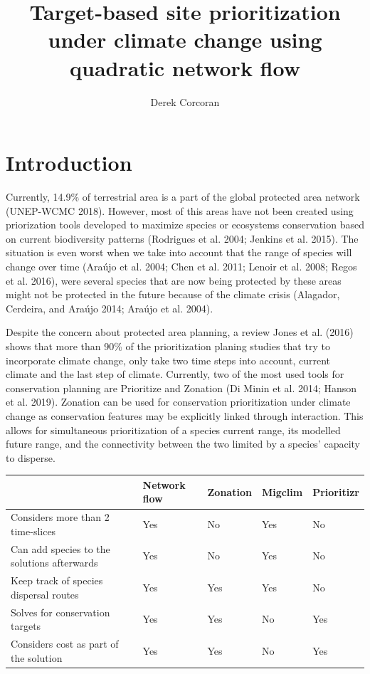 \documentclass[]{article}
\title{Target-based site prioritization under climate change using quadratic network flow}
\author{Derek Corcoran}
\date{}
\begin{document}
\maketitle

\hypertarget{introduction}{%
\section{Introduction}\label{introduction}}

Currently, 14.9\% of terrestrial area is a part of the global protected area network (UNEP-WCMC 2018). However, most of this areas have not been created using priorization tools developed to maximize species or ecosystems conservation based on current biodiversity patterns (Rodrigues et al. 2004; Jenkins et al. 2015). The situation is even worst when we take into account that the range of species will change over time (Araújo et al. 2004; Chen et al. 2011; Lenoir et al. 2008; Regos et al. 2016), were several species that are now being protected by these areas might not be protected in the future because of the climate crisis (Alagador, Cerdeira, and Araújo 2014; Araújo et al. 2004).

Despite the concern about protected area planning, a review Jones et al. (2016) shows that more than 90\% of the prioritization planing studies that try to incorporate climate change, only take two time steps into account, current climate and the last step of climate. Currently, two of the most used tools for conservation planning are Prioritize and Zonation (Di Minin et al. 2014; Hanson et al. 2019). Zonation can be used for conservation prioritization under climate change as conservation features may be explicitly linked through interaction. This allows for simultaneous prioritization of a species current range, its modelled future range, and the connectivity between the two limited by a species' capacity to disperse.

\begin{table}[H]
\centering
\begin{tabular}{lllll}
\toprule
 & Network flow & Zonation & Migclim & Prioritizr\\
\midrule
Considers more than 2 time-slices & Yes & No & Yes & No\\
Can add species to the solutions afterwards & Yes & No & Yes & No\\
Keep track of species dispersal routes & Yes & Yes & Yes & No\\
Solves for conservation targets & Yes & Yes & No & Yes\\
Considers cost as part of the solution & Yes & Yes & No & Yes\\
\bottomrule
\end{tabular}
\end{table}
\end{document}
